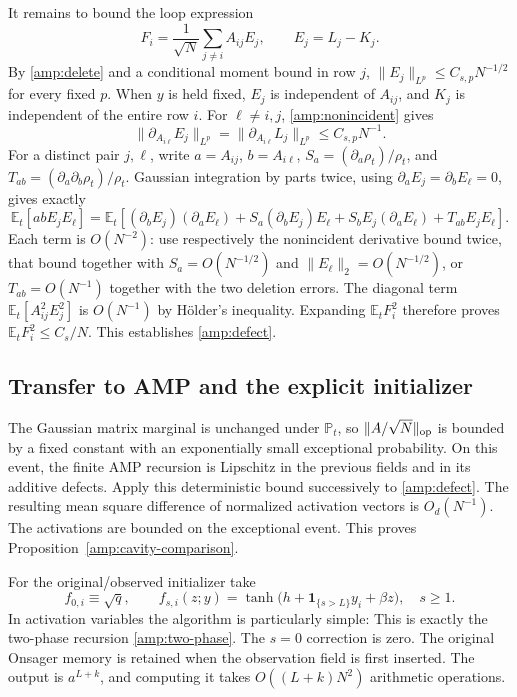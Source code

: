 \documentclass[11pt,reqno]{amsart}
\begin{document}
It remains to bound the loop expression
\[
 F_i=\frac1{\sqrt N}\sum_{j\ne i}A_{ij}E_j,
 \qquad E_j=L_j-K_j.
\]
By \eqref{amp:delete} and a conditional moment bound in row $j$,
$\|E_j\|_{L^p}\le C_{s,p}N^{-1/2}$ for every fixed $p$.
When $y$ is held fixed, $E_j$ is independent of $A_{ij}$, and $K_j$ is
independent of the entire row $i$.  For $\ell\ne i,j$,
\eqref{amp:nonincident} gives
\[
 \|\partial_{A_{i\ell}}E_j\|_{L^p}
 =\|\partial_{A_{i\ell}}L_j\|_{L^p}\le C_{s,p}N^{-1}.
\]
For a distinct pair $j,\ell$, write $a=A_{ij}$, $b=A_{i\ell}$,
$S_a=(\partial_a\rho_t)/\rho_t$, and
$T_{ab}=(\partial_a\partial_b\rho_t)/\rho_t$.
Gaussian integration by parts twice, using
$\partial_aE_j=\partial_bE_\ell=0$, gives exactly
\[
 \mathbb E_t[abE_jE_\ell]
 =\mathbb E_t\left[
  (\partial_bE_j)(\partial_aE_\ell)
  +S_a(\partial_bE_j)E_\ell
  +S_bE_j(\partial_aE_\ell)+T_{ab}E_jE_\ell\right].
\]
Each term is $O(N^{-2})$: use respectively the nonincident derivative
bound twice, that bound together with $S_a=O(N^{-1/2})$ and
$\|E_\ell\|_2=O(N^{-1/2})$, or
$T_{ab}=O(N^{-1})$ together with the two deletion errors.  The diagonal
term $\mathbb E_t[A_{ij}^2E_j^2]$ is $O(N^{-1})$ by H\"older's inequality.
Expanding $\mathbb E_tF_i^2$ therefore proves
$\mathbb E_tF_i^2\le C_s/N$.  This establishes \eqref{amp:defect}.

\subsection{Transfer to AMP and the explicit initializer}

The Gaussian matrix marginal is unchanged under $\mathbb P_t$, so
$\|A/\sqrt N\|_{\rm op}$ is bounded by a fixed constant with an
exponentially small exceptional probability.  On this event, the finite
AMP recursion is Lipschitz in the previous fields and in its additive
defects.  Apply this deterministic bound successively to
\eqref{amp:defect}.  The resulting mean square difference of normalized
activation vectors is $O_d(N^{-1})$.  The activations are bounded on the
exceptional event.  This proves Proposition~\ref{amp:cavity-comparison}.

For the original/observed initializer take
\[
 f_{0,i}\equiv\sqrt q,\qquad
 f_{s,i}(z;y)=\tanh\bigl(h+\mathbf1_{\{s>L\}}y_i+\beta z\bigr),
 \quad s\ge1.
\]
In activation variables the algorithm is particularly simple:
This is exactly the two-phase recursion \eqref{amp:two-phase}.
The $s=0$ correction is zero.  The original Onsager memory is retained
when the observation field is first inserted.  The output is $a^{L+k}$,
and computing it takes $O((L+k)N^2)$ arithmetic operations.
\end{document}
